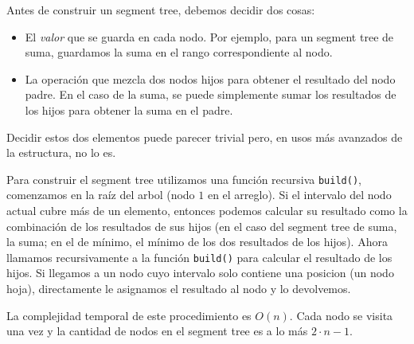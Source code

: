 Antes de construir un segment tree, debemos decidir dos cosas:
\begin{itemize}
    \item{
        El \textit{valor} que se guarda en cada nodo. Por ejemplo, para un
        segment tree de suma, guardamos la suma en el rango correspondiente al nodo.
    }
    \item{
        La operaci\'on que mezcla dos nodos hijos para obtener el resultado del
        nodo padre. En el caso de la suma, se puede simplemente sumar los resultados de los hijos
        para obtener la suma en el padre.
    }
\end{itemize}

Decidir estos dos elementos puede parecer trivial pero, en usos m\'as avanzados de la
estructura, no lo es.

Para construir el segment tree utilizamos una funci\'on recursiva \texttt{build()},
comenzamos en la ra\'iz del arbol (nodo $1$ en el arreglo).
Si el intervalo del nodo actual cubre m\'as de un elemento, entonces podemos calcular su resultado
como la combinaci\'on de los resultados de sus hijos (en el caso del segment tree de suma, la suma;
en el de m\'inimo, el m\'inimo de los dos resultados de los hijos). Ahora llamamos recursivamente a
la funci\'on \texttt{build()} para calcular el resultado de los hijos. Si llegamos a un nodo cuyo
intervalo solo contiene una posicion (un nodo hoja), directamente le asignamos el resultado al nodo
y lo devolvemos.

La complejidad temporal de este procedimiento es $O(n)$. Cada nodo se visita una vez y la cantidad
de nodos en el segment tree es a lo m\'as $2\cdot n -1$.
